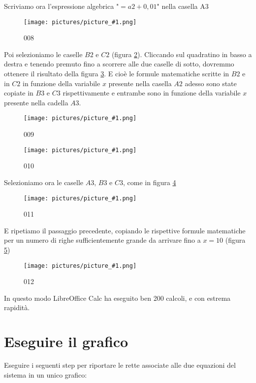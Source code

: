 \documentclass[17pt]{extarticle}
\newcommand{\pict}[1]{
\begin{figure}[h!]		
	\centering
   	\texttt{[image: pictures/picture\_\#1.png]}
  	\caption{#1}
   	\label{fig:LibreOfficeCalc#1}
\end{figure}
}
\begin{document}
Scriviamo ora l'espressione algebrica "$=a2 + 0,01$" nella casella A3

%
\pict{008}


Poi selezioniamo le caselle $B2$ e $C2$ (figura \ref{fig:LibreOfficeCalc009}). Cliccando sul quadratino in basso a destra e tenendo premuto fino a scorrere alle due caselle di sotto, dovremmo ottenere il risultato della figura \ref{fig:LibreOfficeCalc010}. E cioè le formule matematiche scritte in $B2$ e in $C2$ in funzione della variabile $x$ presente nella casella $A2$ adesso sono state copiate in $B3$ e $C3$ rispettivamente e entrambe sono in funzione della variabile $x$ presente nella cadella $A3$.

%
\pict{009}

%
\pict{010}

Selezioniamo ora le caselle $A3$, $B3$ e $C3$, come in figura \ref{fig:LibreOfficeCalc011}

%
\pict{011}

E ripetiamo il passaggio precedente, copiando le rispettive formule matematiche per un numero di righe sufficientemente grande da arrivare fino a $x = 10$ (figura \ref{fig:LibreOfficeCalc012})

%
\pict{012}

In questo modo LibreOffice Calc ha eseguito ben 200 calcoli, e con estrema rapidità.

\newpage

\section{Eseguire il grafico}


Eseguire i seguenti step per riportare le rette associate alle due equazioni del sistema in un unico grafico:
\end{document}
